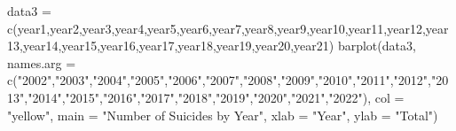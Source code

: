 \documentclass[
  11pt,
  a4paper,
  DIV=11,
  numbers=noendperiod]{scrartcl}
\newenvironment{Shaded}{\begin{snugshade}}{\end{snugshade}}
\newcommand{\AttributeTok}[1]{\textcolor[rgb]{0.40,0.45,0.13}{#1}}
\newcommand{\FunctionTok}[1]{\textcolor[rgb]{0.28,0.35,0.67}{#1}}
\newcommand{\NormalTok}[1]{\textcolor[rgb]{0.00,0.23,0.31}{#1}}
\newcommand{\OtherTok}[1]{\textcolor[rgb]{0.00,0.23,0.31}{#1}}
\newcommand{\SpecialCharTok}[1]{\textcolor[rgb]{0.37,0.37,0.37}{#1}}
\newcommand{\StringTok}[1]{\textcolor[rgb]{0.13,0.47,0.30}{#1}}
\begin{document}
\begin{Shaded}
\end{Shaded}

\begin{Shaded}
\begin{Highlighting}[]
\NormalTok{data3 }\OtherTok{=} \FunctionTok{c}\NormalTok{(year1,year2,year3,year4,year5,year6,year7,year8,year9,year10,year11,year12,year13,year14,year15,year16,year17,year18,year19,year20,year21)}
\FunctionTok{barplot}\NormalTok{(data3, }\AttributeTok{names.arg =} \FunctionTok{c}\NormalTok{(}\StringTok{"2002"}\NormalTok{,}\StringTok{"2003"}\NormalTok{,}\StringTok{"2004"}\NormalTok{,}\StringTok{"2005"}\NormalTok{,}\StringTok{"2006"}\NormalTok{,}\StringTok{"2007"}\NormalTok{,}\StringTok{"2008"}\NormalTok{,}\StringTok{"2009"}\NormalTok{,}\StringTok{"2010"}\NormalTok{,}\StringTok{"2011"}\NormalTok{,}\StringTok{"2012"}\NormalTok{,}\StringTok{"2013"}\NormalTok{,}\StringTok{"2014"}\NormalTok{,}\StringTok{"2015"}\NormalTok{,}\StringTok{"2016"}\NormalTok{,}\StringTok{"2017"}\NormalTok{,}\StringTok{"2018"}\NormalTok{,}\StringTok{"2019"}\NormalTok{,}\StringTok{"2020"}\NormalTok{,}\StringTok{"2021"}\NormalTok{,}\StringTok{"2022"}\NormalTok{), }\AttributeTok{col =} \StringTok{"yellow"}\NormalTok{, }\AttributeTok{main =} \StringTok{"Number of Suicides by Year"}\NormalTok{, }\AttributeTok{xlab =} \StringTok{"Year"}\NormalTok{, }\AttributeTok{ylab =} \StringTok{"Total"}\NormalTok{)}
\end{Highlighting}
\end{Shaded}
\end{document}
